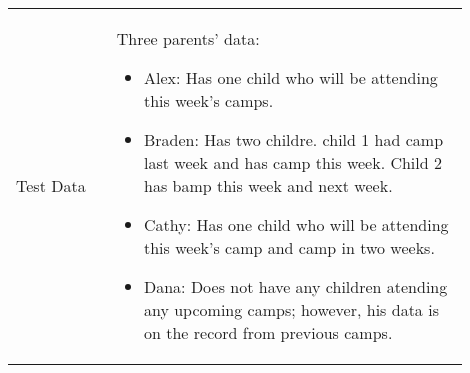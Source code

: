 \documentclass[11pt]{article}
\begin{document}
\begin{table}[H]
\begin{center}
\begin{tabular}{p{0.20\linewidth}p{0.70\linewidth}}
	Test Data & \vspace*{.25em} Three parents' data:
	\begin{itemize}[topsep=0pt]
		\item Alex: Has one child who will be attending this week's camps.
		\item Braden: Has two childre. child 1 had camp last week and has camp this week. Child 2 has bamp this week and next week.
		\item Cathy: Has one child who will be attending this week's camp and camp in two weeks.
		\item Dana: Does not have any children atending any upcoming camps; however, his data is on the record from previous camps.
	\end{itemize}
\end{tabular}
\end{center}
\end{table}
\end{document}
